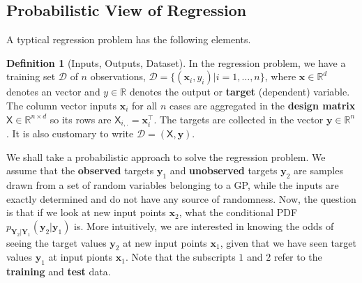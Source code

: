 \documentclass[10pt]{article}
\theoremstyle{definition}
\newtheorem{defn}{Definition}[section]
\begin{document}
\subsection{Probabilistic View of Regression}
A typtical regression problem has the following elements.
\begin{defn}[Inputs, Outputs, Dataset]
In the regression problem, we have a training set $\mathcal{D}$ of $n$ observations, $\mathcal{D}=\{(\mathbf{x}_i, y_i)|i=1,\dots,n\}$, where $\mathbf{x}\in\mathbb{R}^{d}$ denotes an  vector and $y\in\mathbb{R}$ denotes the output or \textbf{target} (dependent) variable. The column vector inputs $\mathbf{x}_i$ for all $n$ cases are aggregated in the \textbf{design matrix} $\mathsf{X}\in \mathbb{R}^{n\times d}$ so its rows are $\mathsf{X}_{i,.}=\mathbf{x}_i^{\top}$. The targets are collected in the vector $\mathbf{y}\in\mathbb{R}^n$. It is also customary to write $\mathcal{D}=(\mathsf{X}, \mathbf{y})$.
\end{defn}
We shall take a probabilistic approach to solve the regression problem. We assume that the \textbf{observed} targets $\mathbf{y}_1$ and \textbf{unobserved} targets $\mathbf{y}_2$ are samples drawn from a set of random variables belonging to a GP, while the inputs are exactly determined and do not have any source of randomness. Now, the question is that if we look at new input points $\mathbf{x}_2$, what the conditional PDF $p_{\mathbf{Y}_2|\mathbf{Y}_1}(\mathbf{y}_2|\mathbf{y}_1)$ is. More intuitively, we are interested in knowing the odds of seeing the target values $\mathbf{y}_2$ at new input points $\mathbf{x}_1$, given that we have seen target values $\mathbf{y}_1$ at input pionts $\mathbf{x}_1$. Note that the subscripts $1$ and $2$ refer to the \textbf{training} and \textbf{test} data.
\end{document}
